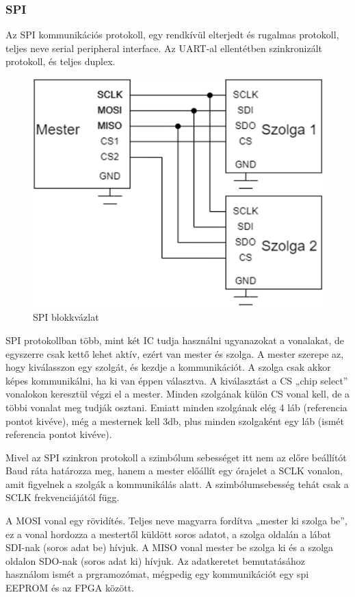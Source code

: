 \documentclass[a4paper,12pt,oneside]{book}
\begin{document}
\subsubsection{SPI}
Az SPI kommunikációs protokoll, egy rendkívül elterjedt és rugalmas protokoll, teljes neve serial peripheral interface. Az UART-al ellentétben szinkronizált protokoll, és teljes duplex.
\begin{figure}[H]
	\centering
	\includegraphics[trim=1mm 1mm 1mm 1mm,scale=0.6]{SPIblockk.PNG}
	\caption{SPI blokkvázlat}
	\label{SPI blokkvázlat}
\end{figure}
SPI protokollban több, mint két IC tudja használni ugyanazokat a vonalakat, de egyszerre csak kettő lehet aktív, ezért van mester és szolga. A mester szerepe az, hogy kiválasszon egy szolgát, és kezdje a kommunikációt. A szolga csak akkor képes kommunikálni, ha ki van éppen választva. A kiválasztást a CS „chip select” vonalokon keresztül végzi el a mester. Minden szolgának külön CS vonal kell, de a többi vonalat meg tudják osztani. Emiatt minden szolgának elég 4 láb (referencia pontot kivéve), még a mesternek kell 3db, plus minden szolgaként egy láb (ismét referencia pontot kivéve). 


Mivel az SPI szinkron protokoll a szimbólum sebességet itt nem az előre beállítót Baud ráta határozza meg, hanem a mester előállít egy órajelet a SCLK vonalon, amit figyelnek a szolgák a kommunikálás alatt. A szimbólumsebesség tehát csak a SCLK frekvenciájától függ. 


A MOSI vonal egy rövidítés. Teljes neve magyarra fordítva „mester ki szolga be”, ez a vonal hordozza a mestertől küldött soros adatot, a szolga oldalán a lábat SDI-nak (soros adat be) hívjuk. A MISO vonal mester be szolga ki és a szolga oldalon SDO-nak (soros adat ki) hívjuk. Az adatkeretet bemutatásához használom ismét a prgramozómat, mégpedig egy kommunikációt egy spi EEPROM és az FPGA között.
\end{document}
